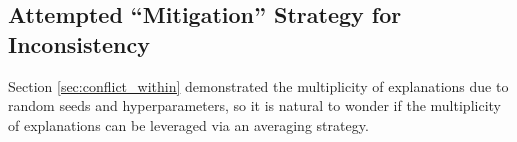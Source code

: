 \documentclass[11pt]{article}    %
\begin{document}
            
        \subsection{Attempted ``Mitigation'' Strategy for Inconsistency} 
        \label{sec:inconsistency_mitigation}
            Section \ref{sec:conflict_within} demonstrated the multiplicity of explanations due to random seeds and hyperparameters, so it is natural to wonder if the multiplicity of explanations can be leveraged via an averaging strategy.
            
\end{document}
